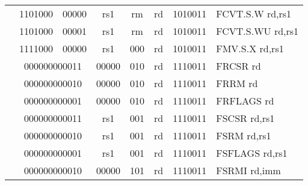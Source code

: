 \begin{table}[p]
\begin{small}
\begin{center}
\begin{tabular}{p{0in}p{0.4in}p{0.05in}p{0.05in}p{0.05in}p{0.05in}p{0.4in}p{0.6in}p{0.4in}p{0.6in}p{0.7in}l}
&
\multicolumn{4}{|c|}{1101000} &
\multicolumn{2}{c|}{00000} &
\multicolumn{1}{c|}{rs1} &
\multicolumn{1}{c|}{rm} &
\multicolumn{1}{c|}{rd} &
\multicolumn{1}{c|}{1010011} & FCVT.S.W rd,rs1 \\
\cline{2-11}
  

&
\multicolumn{4}{|c|}{1101000} &
\multicolumn{2}{c|}{00001} &
\multicolumn{1}{c|}{rs1} &
\multicolumn{1}{c|}{rm} &
\multicolumn{1}{c|}{rd} &
\multicolumn{1}{c|}{1010011} & FCVT.S.WU rd,rs1 \\
\cline{2-11}
  

&
\multicolumn{4}{|c|}{1111000} &
\multicolumn{2}{c|}{00000} &
\multicolumn{1}{c|}{rs1} &
\multicolumn{1}{c|}{000} &
\multicolumn{1}{c|}{rd} &
\multicolumn{1}{c|}{1010011} & FMV.S.X rd,rs1 \\
\cline{2-11}
  

&
\multicolumn{6}{|c|}{000000000011} &
\multicolumn{1}{c|}{00000} &
\multicolumn{1}{c|}{010} &
\multicolumn{1}{c|}{rd} &
\multicolumn{1}{c|}{1110011} & FRCSR rd \\
\cline{2-11}
  

&
\multicolumn{6}{|c|}{000000000010} &
\multicolumn{1}{c|}{00000} &
\multicolumn{1}{c|}{010} &
\multicolumn{1}{c|}{rd} &
\multicolumn{1}{c|}{1110011} & FRRM rd \\
\cline{2-11}
  

&
\multicolumn{6}{|c|}{000000000001} &
\multicolumn{1}{c|}{00000} &
\multicolumn{1}{c|}{010} &
\multicolumn{1}{c|}{rd} &
\multicolumn{1}{c|}{1110011} & FRFLAGS rd \\
\cline{2-11}
  

&
\multicolumn{6}{|c|}{000000000011} &
\multicolumn{1}{c|}{rs1} &
\multicolumn{1}{c|}{001} &
\multicolumn{1}{c|}{rd} &
\multicolumn{1}{c|}{1110011} & FSCSR rd,rs1 \\
\cline{2-11}
  

&
\multicolumn{6}{|c|}{000000000010} &
\multicolumn{1}{c|}{rs1} &
\multicolumn{1}{c|}{001} &
\multicolumn{1}{c|}{rd} &
\multicolumn{1}{c|}{1110011} & FSRM rd,rs1 \\
\cline{2-11}
  

&
\multicolumn{6}{|c|}{000000000001} &
\multicolumn{1}{c|}{rs1} &
\multicolumn{1}{c|}{001} &
\multicolumn{1}{c|}{rd} &
\multicolumn{1}{c|}{1110011} & FSFLAGS rd,rs1 \\
\cline{2-11}
  

&
\multicolumn{6}{|c|}{000000000010} &
\multicolumn{1}{c|}{00000} &
\multicolumn{1}{c|}{101} &
\multicolumn{1}{c|}{rd} &
\multicolumn{1}{c|}{1110011} & FSRMI rd,imm \\
\cline{2-11}
  


\end{tabular}
\end{center}
\end{small}
\end{table}
